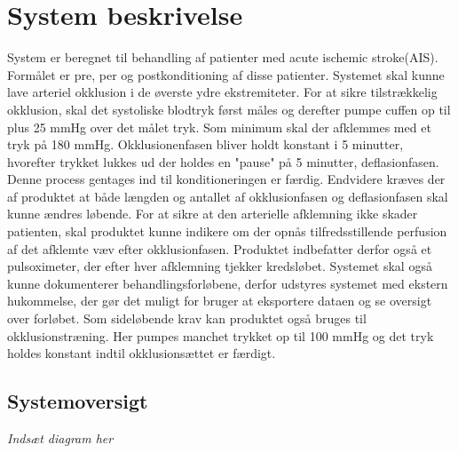 \chapter{System beskrivelse}
System er beregnet til behandling af patienter med acute ischemic stroke(AIS). Formålet er pre, per og postkonditioning af disse patienter. Systemet skal kunne lave arteriel okklusion i de øverste ydre ekstremiteter. For at sikre tilstrækkelig okklusion, skal det systoliske blodtryk først måles og derefter pumpe cuffen op til plus 25 mmHg over det målet tryk. Som minimum skal der afklemmes med et tryk på 180 mmHg. Okklusionenfasen  bliver holdt konstant i 5 minutter, hvorefter trykket lukkes ud der holdes en "pause" på 5 minutter, deflasionfasen. Denne process gentages ind til konditioneringen er færdig.  Endvidere kræves der af produktet at både længden og antallet af okklusionfasen og deflasionfasen skal kunne ændres løbende. 
For at sikre at den arterielle afklemning ikke skader patienten, skal produktet kunne indikere om der opnås tilfredsstillende perfusion af det afklemte væv efter okklusionfasen. Produktet indbefatter derfor også et pulsoximeter, der efter hver afklemning tjekker kredsløbet. Systemet skal også kunne dokumenterer behandlingsforløbene, derfor udstyres systemet med ekstern hukommelse, der gør det muligt for bruger at eksportere dataen og se oversigt over forløbet. 
Som sideløbende krav kan produktet også bruges til okklusionstræning. Her pumpes manchet trykket op til 100 mmHg og det tryk holdes konstant indtil okklusionsættet er færdigt.  

\section{Systemoversigt}
\textit{Indsæt diagram her}